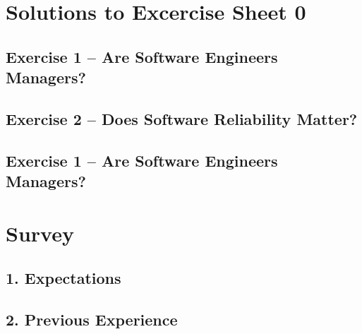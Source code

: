 \documentclass{scrartcl}
\begin{document}
\section*{Solutions to Excercise Sheet 0}

\subsection*{Exercise 1 – Are Software Engineers Managers?}

\subsection*{Exercise 2 – Does Software Reliability Matter?}

\subsection*{Exercise 1 – Are Software Engineers Managers?}

\section*{Survey}

\subsection*{1. Expectations}

\subsection*{2. Previous Experience}
\end{document}
